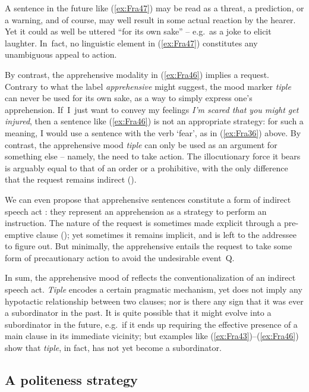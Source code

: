 \documentclass[output=paper,colorlinks,citecolor=brown]{langscibook}
\begin{document}
\noindent A sentence in the future like (\ref{ex:Fra47}) may be read as a threat, a prediction, or a warning, and of course, may well result in some actual reaction by the hearer. Yet it could as well be uttered ``for its own sake'' – e.g.\ as a joke to elicit laughter. In~fact, no linguistic element in (\ref{ex:Fra47}) constitutes any unambiguous appeal to action.


By contrast, the apprehensive modality in (\ref{ex:Fra46}) implies a request. Contrary to what the label \textit{apprehensive} might suggest, the mood marker \textit{tiple} can never be used for its own sake, as a way to simply express one's apprehension. If~I~just want to convey my feelings \textit{I'm scared that you might get injured}, then a sentence like (\ref{ex:Fra46}) is not an appropriate strategy: for such a meaning, I would use a sentence with the verb `fear', as in (\ref{ex:Fra36}) above. By contrast, the apprehensive mood \textit{tiple} can only be used as an argument for something else -- namely, the need to take action. The illocutionary force it bears is arguably equal to that of an \mbox{order} or a prohibitive, with the only difference that the request remains indirect \mbox{()}.


We can even propose that apprehensive sentences constitute a form of indirect speech act \citep{Searle1975}: they represent an apprehension as a strategy to perform an instruction. The nature of the request is sometimes made explicit through a pre-emptive clause (); yet sometimes it remains implicit, and is left to the addressee to figure out. But minimally, the apprehensive entails the request to take some form of precautionary action to avoid the undesirable event~Q. 


In sum, the apprehensive mood of  reflects the conventionalization of an indirect speech act. \textit{Tiple} encodes a certain pragmatic mechanism, yet does not imply any hypotactic relationship between two clauses; nor is there any sign that it was ever a subordinator in the past. It is quite possible that it might evolve into a subordinator in the future, e.g.\ if it ends up requiring the effective presence of a main clause in its immediate vicinity; but examples like (\ref{ex:Fra43})--(\ref{ex:Fra46}) show that \textit{tiple}, in fact, has not yet become a subordinator.
 

\subsection{A politeness strategy}
\label{subsec:politeness}
 
\end{document}
